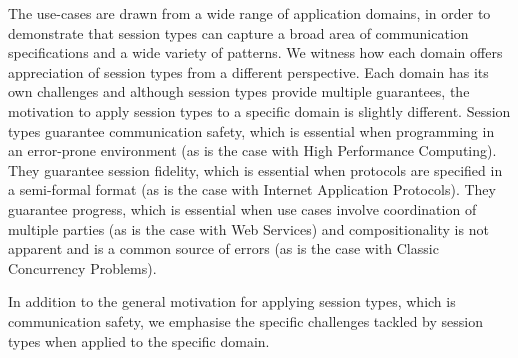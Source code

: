 The use-cases are drawn from a wide range of
application domains, in order to demonstrate that
session types can capture
a broad area of communication specifications and a wide variety of patterns. 
We witness how each domain offers appreciation of session types from a different perspective. %
Each domain has its own challenges and although session types provide multiple guarantees, the motivation to apply session types to a specific domain is slightly different.   
Session types guarantee communication safety, which is essential when programming in an error-prone environment (as is the case with High Performance Computing). They guarantee session fidelity, which is essential when protocols are specified in a semi-formal format (as is the case with Internet Application Protocols). They guarantee progress, which is essential  when use cases involve coordination of multiple parties (as is the case with Web Services) and compositionality is not apparent and is a common source of errors (as is the case with Classic Concurrency Problems).
 
In addition to the general motivation for applying session types, which is communication safety, we emphasise the specific challenges tackled by session types when applied to the specific domain.  

